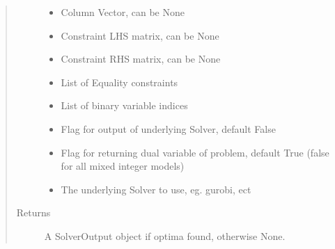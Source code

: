 \documentclass[letterpaper,10pt,english]{sphinxmanual}
\begin{document}
\begin{fulllineitems}
\begin{quote}
\begin{description}
\begin{itemize}
\item {} 
\sphinxAtStartPar
{} \textendash{} Column Vector, can be None

\item {} 
\sphinxAtStartPar
{} \textendash{} Constraint LHS matrix, can be None

\item {} 
\sphinxAtStartPar
{} \textendash{} Constraint RHS matrix, can be None

\item {} 
\sphinxAtStartPar
{} \textendash{} List of Equality constraints

\item {} 
\sphinxAtStartPar
{} \textendash{} List of binary variable indices

\item {} 
\sphinxAtStartPar
{} \textendash{} Flag for output of underlying Solver, default False

\item {} 
\sphinxAtStartPar
{} \textendash{} Flag for returning dual variable of problem, default True (false for all mixed integer models)

\item {} 
\sphinxAtStartPar
{} \textendash{} The underlying Solver to use, eg. gurobi, ect

\end{itemize}

\item[{Returns}] \leavevmode
\sphinxAtStartPar
A SolverOutput object if optima found, otherwise None.

\end{description}\end{quote}

\end{fulllineitems}

\end{document}
